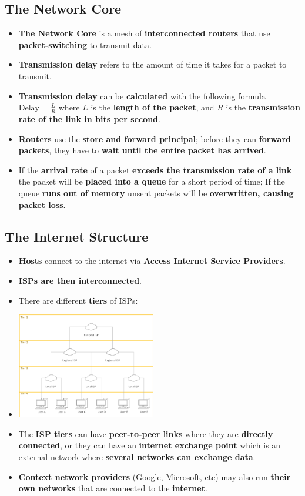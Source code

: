 \documentclass[16pt]{article}
\begin{document}
   \subsection*{The Network Core}
   \begin{itemize}
       \item \textbf{The Network Core} is a mesh of \textbf{interconnected routers} that use \textbf{packet-switching} to transmit data.
       \item \textbf{Transmission delay} refers to the amount of time it takes for a packet to transmit.
       \item \textbf{Transmission delay} can be \textbf{calculated} with the following formula $\text{Delay}=\frac{L}{R}$ where $L$ is the \textbf{length of the packet}, and $R$ is the \textbf{transmission rate of the link in bits per second}.
       \item \textbf{Routers} use the \textbf{store and forward principal}; before they can \textbf{forward packets}, they have to \textbf{wait until the entire packet has arrived}.
       \item If the \textbf{arrival rate} of a packet \textbf{exceeds the transmission rate of a link} the packet will be \textbf{placed into a queue} for a short period of time; If the queue \textbf{runs out of memory} unsent packets will be \textbf{overwritten, causing packet loss}.
   \end{itemize}

   \subsection*{The Internet Structure}
   \begin{itemize}
       \item \textbf{Hosts} connect to the internet via \textbf{Access Internet Service Providers}.
       \item \textbf{ISPs are then interconnected}.
       \item There are different \textbf{tiers} of ISPs:
       \item[] \includegraphics[height=175px]{images/ISP-Structure.png}
       \item The \textbf{ISP tiers} can have \textbf{peer-to-peer links} where they are \textbf{directly connected}, or they can have an \textbf{internet exchange point} which is an external network where \textbf{several networks can exchange data}.
       \item \textbf{Context network providers} (Google, Microsoft, etc) may also run \textbf{their own networks} that are connected to the \textbf{internet}.
   \end{itemize}
\end{document}
